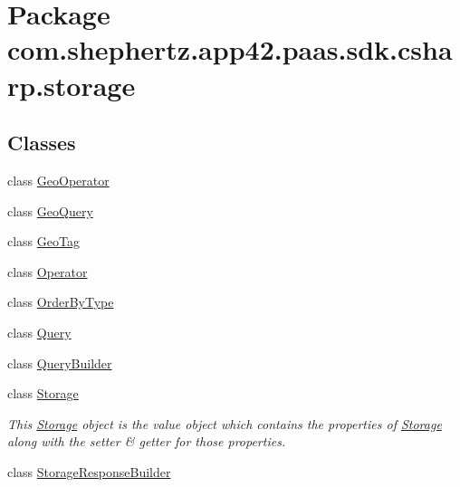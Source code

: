 \hypertarget{namespacecom_1_1shephertz_1_1app42_1_1paas_1_1sdk_1_1csharp_1_1storage}{\section{Package com.\+shephertz.\+app42.\+paas.\+sdk.\+csharp.\+storage}
\label{namespacecom_1_1shephertz_1_1app42_1_1paas_1_1sdk_1_1csharp_1_1storage}
}
\subsection*{Classes}
\begin{DoxyCompactItemize}
\item 
class \hyperlink{classcom_1_1shephertz_1_1app42_1_1paas_1_1sdk_1_1csharp_1_1storage_1_1_geo_operator}{Geo\+Operator}
\item 
class \hyperlink{classcom_1_1shephertz_1_1app42_1_1paas_1_1sdk_1_1csharp_1_1storage_1_1_geo_query}{Geo\+Query}
\item 
class \hyperlink{classcom_1_1shephertz_1_1app42_1_1paas_1_1sdk_1_1csharp_1_1storage_1_1_geo_tag}{Geo\+Tag}
\item 
class \hyperlink{classcom_1_1shephertz_1_1app42_1_1paas_1_1sdk_1_1csharp_1_1storage_1_1_operator}{Operator}
\item 
class \hyperlink{classcom_1_1shephertz_1_1app42_1_1paas_1_1sdk_1_1csharp_1_1storage_1_1_order_by_type}{Order\+By\+Type}
\item 
class \hyperlink{classcom_1_1shephertz_1_1app42_1_1paas_1_1sdk_1_1csharp_1_1storage_1_1_query}{Query}
\item 
class \hyperlink{classcom_1_1shephertz_1_1app42_1_1paas_1_1sdk_1_1csharp_1_1storage_1_1_query_builder}{Query\+Builder}
\item 
class \hyperlink{classcom_1_1shephertz_1_1app42_1_1paas_1_1sdk_1_1csharp_1_1storage_1_1_storage}{Storage}
\begin{DoxyCompactList}\small\item\em This \hyperlink{classcom_1_1shephertz_1_1app42_1_1paas_1_1sdk_1_1csharp_1_1storage_1_1_storage}{Storage} object is the value object which contains the properties of \hyperlink{classcom_1_1shephertz_1_1app42_1_1paas_1_1sdk_1_1csharp_1_1storage_1_1_storage}{Storage} along with the setter \& getter for those properties. \end{DoxyCompactList}\item 
class \hyperlink{classcom_1_1shephertz_1_1app42_1_1paas_1_1sdk_1_1csharp_1_1storage_1_1_storage_response_builder}{Storage\+Response\+Builder}

\end{DoxyCompactItemize}

